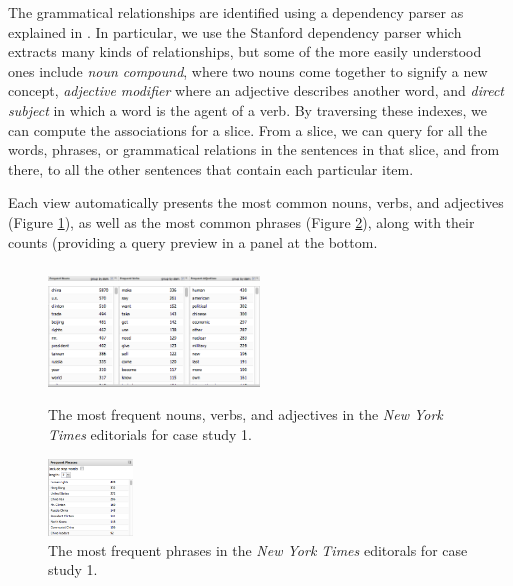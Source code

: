 \documentclass{sig-alternate}
\begin{document}
\begin{enumerate}
  The grammatical relationships are identified using a dependency parser as explained in \cite{jurafsky_chapter_2009}. In particular, we use the Stanford dependency parser\cite{klein_accurate_2003} which extracts many kinds of relationships, but some of the more easily understood ones include \emph{noun compound}, where two nouns come together to signify a new concept, \emph{adjective modifier} where an adjective describes another word, and \emph{direct subject} in which a word is the agent of a verb. By traversing these indexes, we can compute the associations for a slice. From a slice, we can query for all the words, phrases, or grammatical relations in the sentences in that slice, and from there, to all the other sentences that contain each particular item.  


Each view automatically presents the most common nouns, verbs, and adjectives (Figure \ref{fig:intro06}), as well as the most common phrases (Figure \ref{fig:intro07}), along with their counts (providing a query preview \cite{shneiderman} in a panel at the bottom.    
\begin{figure}[ht!]
\begin{center}
	\includegraphics[width=0.5\textwidth]{fig/intro/06a.png}
	\includegraphics[width=0.5\textwidth]{fig/intro/06.png}
\end{center}
    \caption{%
       The most frequent nouns, verbs, and adjectives in the \emph{New York Times} editorials for case study 1.  \label{fig:intro06}
     }%
\end{figure}

\begin{figure}[ht!]
\begin{center}
	\includegraphics[width=0.2\textwidth]{fig/intro/07.png}
\end{center}
    \caption{%
       The most frequent phrases in the \emph{New York Times} editorals for case study 1. \label{fig:intro07}
     }%
\end{figure}


\end{enumerate}
\end{document}
